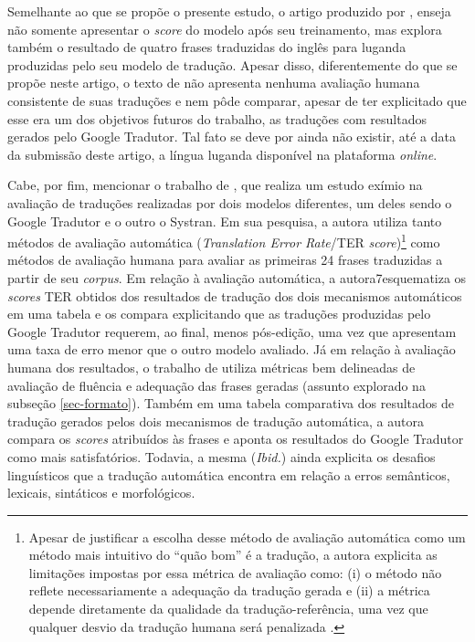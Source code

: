 \documentclass[portuguese]{textolivre}
\begin{document}
Semelhante ao que se propõe o presente estudo, o artigo produzido por \textcite{kimera_building_2022}, enseja não somente apresentar o \textit{score} do modelo após seu treinamento, mas explora também o resultado de quatro frases traduzidas do inglês para luganda produzidas pelo seu modelo de tradução. Apesar disso, diferentemente do que se propõe neste artigo, o texto de \textcite{kimera_building_2022} não apresenta nenhuma avaliação humana consistente de suas traduções e nem pôde comparar, apesar de ter explicitado que esse era um dos objetivos futuros do trabalho, as traduções com resultados gerados pelo Google Tradutor. Tal fato se deve por ainda não existir, até a data da submissão deste artigo, a língua luganda disponível na plataforma \textit{online}.

Cabe, por fim, mencionar o trabalho de \textcite{banitz_machine_2020}, que realiza um estudo exímio na avaliação de traduções realizadas por dois modelos diferentes, um deles sendo o Google Tradutor e o outro o Systran. Em sua pesquisa, a autora utiliza tanto métodos de avaliação automática (\textit{Translation Error Rate}/TER \textit{score})\footnote{Apesar de justificar a escolha desse método de avaliação automática como um método mais intuitivo do “quão bom” é a tradução, a autora explicita as limitações impostas por essa métrica de avaliação como: (i) o método não reflete necessariamente a adequação da tradução gerada e (ii) a métrica depende diretamente da qualidade da tradução-referência, uma vez que qualquer desvio da tradução humana será penalizada \cite{banitz_machine_2020}.} como métodos de avaliação humana para avaliar as primeiras 24 frases traduzidas a partir de seu \textit{corpus}. Em relação à avaliação automática, a autora7esquematiza os \textit{scores} TER obtidos dos resultados de tradução dos dois mecanismos automáticos em uma tabela e os compara explicitando que as traduções produzidas pelo Google Tradutor requerem, ao final, menos pós-edição, uma vez que apresentam uma taxa de erro menor que o outro modelo avaliado. Já em relação à avaliação humana dos resultados, o trabalho de \textcite{banitz_machine_2020} utiliza métricas bem delineadas de avaliação de fluência e adequação das frases geradas (assunto explorado na subseção \ref{sec-formato}). Também em uma tabela comparativa dos resultados de tradução gerados pelos dois mecanismos de tradução automática, a autora compara os \textit{scores} atribuídos às frases e aponta os resultados do Google Tradutor como mais satisfatórios. Todavia, a mesma (\textit{Ibid.}) ainda explicita os desafios linguísticos que a tradução automática encontra em relação a erros semânticos, lexicais, sintáticos e morfológicos.
 
\end{document}
